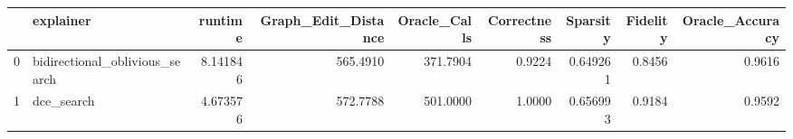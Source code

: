 \begin{tabular}{llrrrrrrr}
\toprule
{} &                       explainer &   runtime &  Graph\_Edit\_Distance &  Oracle\_Calls &  Correctness &  Sparsity &  Fidelity &  Oracle\_Accuracy \\
\midrule
0 &  bidirectional\_oblivious\_search &  8.141846 &             565.4910 &      371.7904 &       0.9224 &  0.649261 &    0.8456 &           0.9616 \\
1 &                      dce\_search &  4.673576 &             572.7788 &      501.0000 &       1.0000 &  0.656993 &    0.9184 &           0.9592 \\
\bottomrule
\end{tabular}
